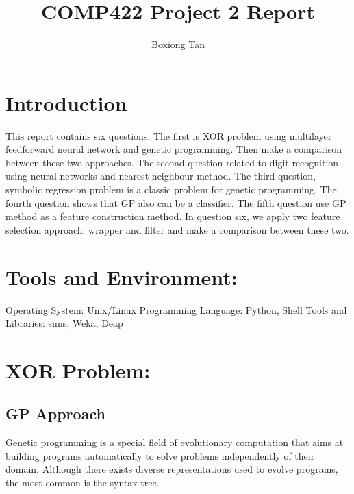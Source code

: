 \documentclass[11pt, a4paper, oneside, openright]{article}
\title{COMP422 Project 2 Report}
\author{Boxiong Tan}
\begin{document}
\frontmatter


\begin{abstract}
\end{abstract}


\maketitle




\mainmatter


\section{Introduction}
This report contains six questions. The first is XOR problem using multilayer
feedforward neural network and genetic programming. Then make a comparison between
these two approaches. The second question related to digit recognition using neural networks and nearest neighbour method. The third question, symbolic regression problem is a classic problem for genetic programming. The fourth question shows that GP also can be a classifier. The fifth question use GP method as a feature construction method. In question six, we apply two feature selection approach: wrapper and filter and make a comparison between these two.

\section{Tools and Environment:}
Operating System: Unix/Linux
\newline Programming Language: Python, Shell
\newline Tools and Libraries: snns, Weka, Deap

\section{XOR Problem:}
\subsection{GP Approach}
Genetic programming is a special field of evolutionary computation that aims at building programs automatically to solve problems independently of their domain. Although there exists diverse representations used to evolve programs, the most common is the syntax tree.
\end{document}
